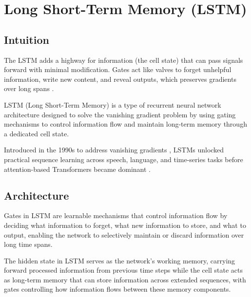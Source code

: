 
\section{Long Short-Term Memory (LSTM) }
\label{sec:lstm}

\subsection*{Intuition}

The LSTM adds a highway for information (the cell state) that can pass signals forward with minimal modification. Gates act like valves to forget unhelpful information, write new content, and reveal outputs, which preserves gradients over long spans \cite{Hochreiter1997,GoodfellowEtAl2016}.

LSTM (Long Short-Term Memory) is a type of recurrent neural network architecture designed to solve the vanishing gradient problem by using gating mechanisms to control information flow and maintain long-term memory through a dedicated cell state.

\begin{remark}
Introduced in the 1990s to address vanishing gradients \cite{Hochreiter1997}, LSTMs unlocked practical sequence learning across speech, language, and time-series tasks before attention-based Transformers became dominant \cite{Vaswani2017}.
\end{remark}


\subsection{Architecture}

\begin{remark}
Gates in LSTM are learnable mechanisms that control information flow by deciding what information to forget, what new information to store, and what to output, enabling the network to selectively maintain or discard information over long time spans.
\end{remark}

\begin{remark}
The hidden state in LSTM serves as the network's working memory, carrying forward processed information from previous time steps while the cell state acts as long-term memory that can store information across extended sequences, with gates controlling how information flows between these memory components.
\end{remark}

